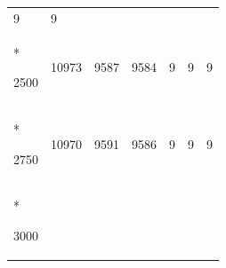 \documentclass[
  12pt,
  oneside,
  openany]{book}
\begin{document}
\begin{appendices}
\begin{singlespace}
\begin{longtable}[]{@{}lllllll@{}}
\begin{minipage}[t]{0.14\columnwidth}
9\strut
\end{minipage} & \begin{minipage}[t]{0.12\columnwidth}\raggedright
9\strut
\end{minipage}\tabularnewline*
\begin{minipage}[t]{0.15\columnwidth}\raggedright
2500\strut
\end{minipage} & \begin{minipage}[t]{0.08\columnwidth}\raggedright
10973\strut
\end{minipage} & \begin{minipage}[t]{0.07\columnwidth}\raggedright
9587\strut
\end{minipage} & \begin{minipage}[t]{0.08\columnwidth}\raggedright
9584\strut
\end{minipage} & \begin{minipage}[t]{0.17\columnwidth}\raggedright
9\strut
\end{minipage} & \begin{minipage}[t]{0.14\columnwidth}\raggedright
9\strut
\end{minipage} & \begin{minipage}[t]{0.12\columnwidth}\raggedright
9\strut
\end{minipage}\tabularnewline*
\begin{minipage}[t]{0.15\columnwidth}\raggedright
2750\strut
\end{minipage} & \begin{minipage}[t]{0.08\columnwidth}\raggedright
10970\strut
\end{minipage} & \begin{minipage}[t]{0.07\columnwidth}\raggedright
9591\strut
\end{minipage} & \begin{minipage}[t]{0.08\columnwidth}\raggedright
9586\strut
\end{minipage} & \begin{minipage}[t]{0.17\columnwidth}\raggedright
9\strut
\end{minipage} & \begin{minipage}[t]{0.14\columnwidth}\raggedright
9\strut
\end{minipage} & \begin{minipage}[t]{0.12\columnwidth}\raggedright
9\strut
\end{minipage}\tabularnewline*
\begin{minipage}[t]{0.15\columnwidth}\raggedright
3000\strut
\end{minipage} & \begin{minipage}[t]{0.08\columnwidth}\raggedright

\end{minipage}
\end{longtable}
\end{singlespace}
\end{appendices}
\end{document}

